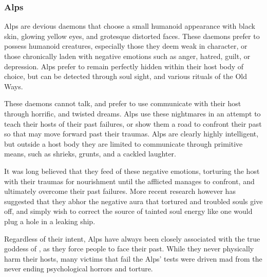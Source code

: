 \subsubsection{Alps}
\label{sec:Alps}

Alps are devious daemons that choose a small humanoid appearance with black
skin, glowing yellow eyes, and grotesque distorted faces. These daemons prefer
to possess humanoid creatures, especially those they deem weak in character,
or those chronically laden with negative emotions such as anger, hatred,
guilt, or depression. Alps prefer to remain perfectly hidden within their host
body of choice, but can be detected through soul sight, and various rituals of
the Old Ways.

These daemons cannot talk, and prefer to use communicate with their host
through horrific, and twisted dreams. Alps use these nightmares in an attempt
to teach their hosts of their past failures, or show them a road to confront
their past so that may move forward past their traumas. Alps are clearly
highly intelligent, but outside a host body they are limited to communicate
through primitive means, such as shrieks, grunts, and a cackled laughter.


It was long believed that they feed of these negative emotions, torturing the
host with their traumas for nourishment until the afflicted manages to confront,
and ultimately overcome their past failures. More recent research however has
suggested that they abhor the negative aura that tortured and troubled souls
give off, and simply wish to correct the source of tainted soul energy like one
would plug a hole in a leaking ship.

Regardless of their intent, Alps have always been closely associated with the
true goddess of , as they force people to face their past.
While they never physically harm their hosts, many victims that fail the Alps'
tests were driven mad from the never ending psychological horrors and torture.

